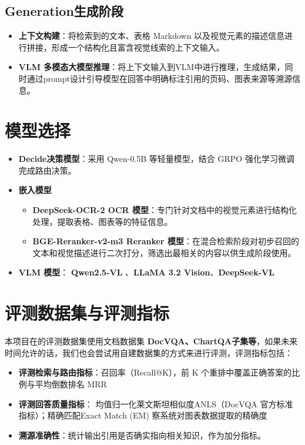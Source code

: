 \subsection{Generation生成阶段}

\begin{itemize}
    \item \textbf{上下文构建}：将检索到的文本、表格 Markdown 以及视觉元素的描述信息进行拼接，形成一个结构化且富含视觉线索的上下文输入。
    \item \textbf{VLM 多模态大模型推理}：将上下文输入到VLM中进行推理，生成结果，同时通过prompt设计引导模型在回答中明确标注引用的页码、图表来源等溯源信息。
\end{itemize}

\section{模型选择}

\begin{itemize}
    \item \textbf{Decide决策模型}：采用 Qwen-0.5B 等轻量模型，结合 GRPO 强化学习微调完成路由决策。
    \item \textbf{嵌入模型}
    \begin{itemize}
        \item \textbf{DeepSeek-OCR-2 OCR 模型}：专门针对文档中的视觉元素进行结构化处理，提取表格、图表等的特征信息。
        \item \textbf{BGE-Reranker-v2-m3 Reranker 模型}：在混合检索阶段对初步召回的文本和视觉描述进行二次打分，筛选出最相关的内容以供生成阶段使用。
    \end{itemize}
    \item \textbf{VLM 模型}： \textbf{Qwen2.5-VL }、\textbf{LLaMA 3.2 Vision}、\textbf{DeepSeek-VL}
\end{itemize}

\section{评测数据集与评测指标}

本项目在的评测数据集使用文档数据集\textbf{ DocVQA、ChartQA子集等}，如果未来时间允许的话，我们也会尝试用自建数据集的方式来进行评测，评测指标包括：

\begin{itemize}
    \item \textbf{评测检索与路由指标}：召回率（Recall@K），前 K 个重排中覆盖正确答案的比例与平均倒数排名 MRR
    \item \textbf{评测回答质量指标}： 均值归一化莱文斯坦相似度ANLS（DocVQA 官方标准指标）；精确匹配Exact Match (EM) 察系统对图表数据提取的精确度
    \item \textbf{溯源准确性}：统计输出引用是否确实指向相关知识，作为加分指标。
\end{itemize}
